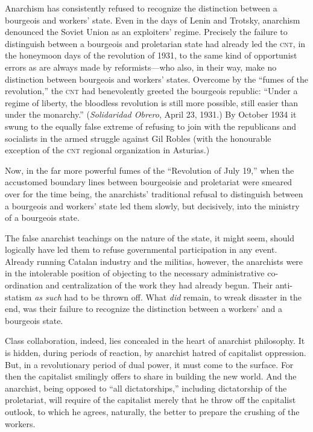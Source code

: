 Anarchism has consistently refused to recognize the distinction between a bourgeois and workers’ state. Even in the days of Lenin and Trotsky, anarchism denounced the Soviet Union as an exploiters’ regime. Precisely the failure to distinguish between a bourgeois and proletarian state had already led the \textsc{cnt}, in the honeymoon days of the revolution of 1931, to the same kind of opportunist errors as are always made by reformists---who also, in their way, make no distinction between bourgeois and workers’ states. Overcome by the ``fumes of the revolution,'' the \textsc{cnt} had benevolently greeted the bourgeois republic: ``Under a regime of liberty, the bloodless revolution is still more possible, still easier than under the monarchy.'' (\emph{Solidaridad Obrero}, April 23, 1931.) By October 1934 it swung to the equally false extreme of refusing to join with the republicans and socialists in the armed struggle against Gil Robles (with the honourable exception of the \textsc{cnt} regional organization in Asturias.)

Now, in the far more powerful fumes of the ``Revolution of July 19,'' when the accustomed boundary lines between bourgeoisie and proletariat were smeared over for the time being, the anarchists’ traditional refusal to distinguish between a bourgeois and workers’ state led them slowly, but decisively, into the ministry of a bourgeois state.

The false anarchist teachings on the nature of the state, it might seem, should logically have led them to refuse governmental participation in any event. Already running Catalan industry and the militias, however, the anarchists were in the intolerable position of objecting to the necessary administrative co-ordination and centralization of the work they had already begun. Their anti-statism \emph{as such} had to be thrown off. What \emph{did} remain, to wreak disaster in the end, was their failure to recognize the distinction between a workers’ and a bourgeois state.

Class collaboration, indeed, lies concealed in the heart of anarchist philosophy. It is hidden, during periods of reaction, by anarchist hatred of capitalist oppression. But, in a revolutionary period of dual power, it must come to the surface. For then the capitalist smilingly offers to share in building the new world. And the anarchist, being opposed to ``all dictatorships,'' including dictatorship of the proletariat, will require of the capitalist merely that he throw off the capitalist outlook, to which he agrees, naturally, the better to prepare the crushing of the workers.


